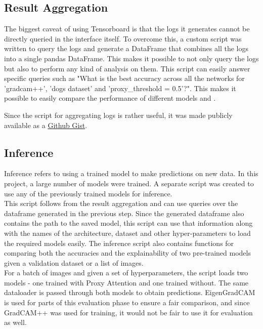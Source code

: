 \documentclass[a4paper,11pt,openright]{book}
\begin{document}
\subsection{Result Aggregation} \label{sec:result_aggregation}
The biggest caveat of using Tensorboard is that the logs it generates cannot be directly queried in the interface itself. To overcome this, a custom script was written to query the logs and generate a DataFrame that combines all the logs into a single pandas DataFrame. This makes it possible to not only query the logs but also to perform any kind of analysis on them. This script can easily answer specific queries such as "What is the best accuracy across all the networks for 'gradcam++', 'dogs dataset' and 'proxy\_threshold = 0.5'?". This makes it possible to easily compare the performance of different models and .

Since the script for aggregating logs is rather useful, it was made publicly available as a \href{https://gist.github.com/SubhadityaMukherjee/58cbdf324812175233e91993b720e0bc}{Github Gist}.

\subsection{Inference}
Inference refers to using a trained model to make predictions on new data. In this project, a large number of models were trained. A separate script was created to use any of the previously trained models for inference.\\
This script follows from the result aggregation and can use queries over the dataframe generated in the previous step. Since the generated dataframe also contains the path to the saved model, this script can use that information along with the names of the architecture, dataset and other hyper-parameters to load the required models easily.
The inference script also contains functions for comparing both the accuracies and the explainability of two pre-trained models given a validation dataset or a list of images.\\
For a batch of images and given a set of hyperparameters, the script loads two models - one trained with Proxy Attention and one trained without. The same dataloader is passed through both models to obtain predictions. EigenGradCAM is used for parts of this evaluation phase to ensure a fair comparison, and since GradCAM++ was used for training, it would not be fair to use it for evaluation as well. 
\end{document}
